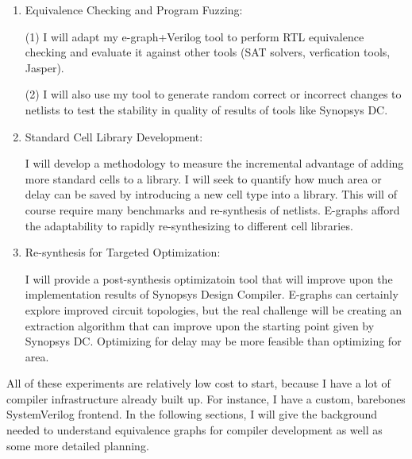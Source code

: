 \documentclass[10pt,letterpaper]{article}
\begin{document}
\begin{enumerate}
    \item Equivalence Checking and Program Fuzzing:

          \hspace{2em}\begin{minipage}{0.8\linewidth}
              (1) I will adapt my e-graph+Verilog tool to perform RTL equivalence checking and evaluate it against other tools (SAT solvers, verfication tools, Jasper).

              (2) I will also use my tool to generate random correct or incorrect changes to netlists to test the stability in quality of results of tools like Synopsys DC.
          \end{minipage}

    \item Standard Cell Library Development:

          \hspace{2em}\begin{minipage}{0.8\linewidth}
              I will develop a methodology to measure the incremental advantage of adding more standard cells to a library.
              I will seek to quantify how much area or delay can be saved by introducing a new cell type into a library. This will of course require many benchmarks and re-synthesis of netlists.
              E-graphs afford the adaptability to rapidly re-synthesizing to different cell libraries.
          \end{minipage}

    \item Re-synthesis for Targeted Optimization:

          \hspace{2em}\begin{minipage}{0.8\linewidth}
              I will provide a post-synthesis optimizatoin tool that will improve upon the implementation results of Synopsys Design Compiler.
              E-graphs can certainly explore improved circuit topologies, but the real challenge will be creating an extraction algorithm that can improve upon the starting point given by Synopsys DC.
              Optimizing for delay may be more feasible than optimizing for area.
          \end{minipage}
\end{enumerate}

All of these experiments are relatively low cost to start, because I have a lot
of compiler infrastructure already built up. For instance, I have a custom,
barebones SystemVerilog frontend. In the following sections, I will give the
background needed to understand equivalence graphs for compiler development as
well as some more detailed planning.
\end{document}
